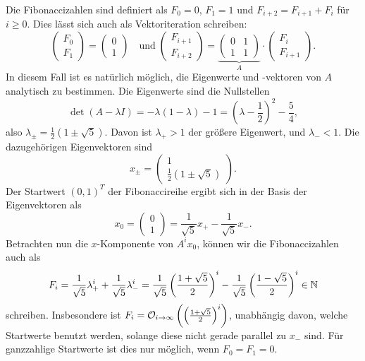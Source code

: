 Die Fibonaccizahlen sind definiert als $F_0 = 0$, $F_1=1$ und
$F_{i+2} = F_{i+1} + F_i$ für $i \ge 0$. Dies lässt sich auch als
Vektoriteration schreiben:
\begin{equation}
  \begin{pmatrix}
    F_0\\
    F_1
  \end{pmatrix}=
  \begin{pmatrix}
    0\\
    1
  \end{pmatrix}
  \quad\text{und}\;
  \begin{pmatrix}
    F_{i+1}\\
    F_{i+2}
  \end{pmatrix}=
  \underbrace{\begin{pmatrix}
      0 & 1\\
      1 & 1
    \end{pmatrix}}_A\cdot
  \begin{pmatrix}
    F_i\\
    F_{i+1}
  \end{pmatrix}.
\end{equation}
In diesem Fall ist es natürlich möglich, die Eigenwerte und -vektoren
von $A$ analytisch zu bestimmen. Die Eigenwerte sind die Nullstellen
\begin{equation}
  \det(A-\lambda I) = -\lambda(1-\lambda) - 1 = \left(\lambda
    -\frac{1}{2}\right)^2 - \frac{5}{4},
\end{equation}
also $\lambda_{\pm} = \frac{1}{2} \left(1 \pm \sqrt{5}\right)$. Davon
ist $\lambda_+ > 1$ der größere Eigenwert, und $\lambda_-<1$. Die
dazugehörigen Eigenvektoren sind
\begin{equation}
  x_{\pm} =
  \begin{pmatrix}
    1\\
    \frac{1}{2} \left(1 \pm
      \sqrt{5}\right)
  \end{pmatrix}.
\end{equation}
Der Startwert $(0,1)^T$ der Fibonaccireihe ergibt sich in der Basis
der Eigenvektoren als
\begin{equation}
  x_0 = 
  \begin{pmatrix}
    0\\
    1
  \end{pmatrix} =
  \frac{1}{\sqrt{5}} x_+ - \frac{1}{\sqrt{5}} x_-.
\end{equation}
Betrachten nun die $x$-Komponente von $A^ix_0$, können wir die
Fibonaccizahlen auch als
\begin{equation}
  F_i = \frac{1}{\sqrt{5}}\lambda_+^i + \frac{1}{\sqrt{5}}\lambda_-^i
  = \frac{1}{\sqrt{5}} \left(\frac{1 + \sqrt{5}}{2}\right)^i
  - \frac{1}{\sqrt{5}} \left(\frac{1 - \sqrt{5}}{2}\right)^i \in\mathbb{N}
\end{equation}
schreiben. Insbesondere ist $F_i = \mathcal O_{i\to\infty}\left(\left(\frac{1
      + \sqrt{5}}{2}\right)^i\right)$, unabhängig davon, welche
Startwerte benutzt werden, solange diese nicht gerade parallel zu
$x_-$ sind. Für ganzzahlige Startwerte ist dies nur möglich, wenn
$F_0=F_1=0$. 

